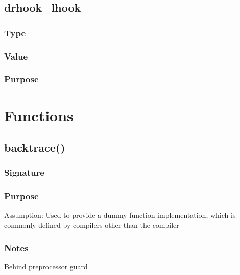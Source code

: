 \documentclass[letterpaper,10pt,english]{sphinxmanual}
\begin{document}
\section{drhook\_lhook}
\label{\detokenize{global_vars/global_vars:drhook-lhook}}\label{\detokenize{global_vars/global_vars:id2}}

\subsection{Type}
\label{\detokenize{global_vars/global_vars:id3}}
\sphinxAtStartPar
{}


\subsection{Value}
\label{\detokenize{global_vars/global_vars:id4}}
\sphinxAtStartPar
{}


\subsection{Purpose}
\label{\detokenize{global_vars/global_vars:id5}}
\sphinxstepscope


\chapter{Functions}
\label{\detokenize{functions/functions:functions}}\label{\detokenize{functions/functions::doc}}

\section{backtrace()}
\label{\detokenize{functions/functions:backtrace}}\label{\detokenize{functions/functions:id1}}

\subsection{Signature}
\label{\detokenize{functions/functions:signature}}
\sphinxAtStartPar
{}


\subsection{Purpose}
\label{\detokenize{functions/functions:purpose}}
\sphinxAtStartPar
Assumption: Used to provide a dummy function implementation, which is commonly defined by compilers other than the  compiler


\subsection{Notes}
\label{\detokenize{functions/functions:notes}}
\sphinxAtStartPar
Behind preprocessor guard 



\renewcommand{\indexname}{Index}
\printindex
\end{document}
